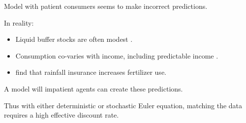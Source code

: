 \documentclass[aspectratio=169, 10pt, handout]{beamer}
\newenvironment{wideitemize}{\itemize\addtolength{\itemsep}{10pt}}{\enditemize}
\begin{document}
\begin{frame}{Model with patient consumers seems to make incorrect predictions.}

\begin{wideitemize}

	\item In reality:

	\begin{itemize}
	
		\item Liquid buffer stocks are often modest \citep{deaton1991saving}.
	
		\item Consumption co-varies with income, including predictable income \citep{townsend1995consumption}.
	
		\item \cite{karlan2014agricultural} find that rainfall insurance increases fertilizer use.

	\end{itemize}
	
	\item A model will impatient agents can create these predictions.

	\item Thus with either deterministic or stochastic Euler equation, matching the data requires a high effective discount rate.

\end{wideitemize}


\end{frame}
\end{document}
